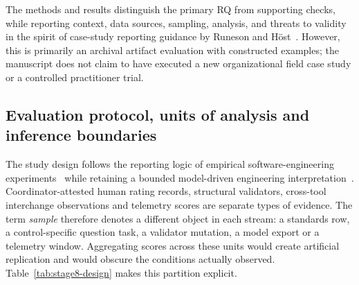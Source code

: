 \documentclass[12pt,a4paper]{article}
\begin{document}
The methods and results distinguish the primary RQ from supporting checks, while reporting context, data sources, sampling, analysis, and threats to validity in the spirit of case-study reporting guidance by Runeson and H{\"o}st~\cite{RunesonHost2009CaseStudy}. However, this is primarily an archival artifact evaluation with constructed examples; the manuscript does not claim to have executed a new organizational field case study or a controlled practitioner trial.\par


\subsection{Evaluation protocol, units of analysis and inference boundaries}
\label{sec:evaluation-matrix}
The study design follows the reporting logic of empirical software-engineering experiments~\cite{Wohlin2012Experimentation} while retaining a bounded model-driven engineering interpretation~\cite{Schmidt2006MDE}. Coordinator-attested human rating records, structural validators, cross-tool interchange observations and telemetry scores are separate types of evidence. The term \emph{sample} therefore denotes a different object in each stream: a standards row, a control-specific question task, a validator mutation, a model export or a telemetry window. Aggregating scores across these units would create artificial replication and would obscure the conditions actually observed. Table~\ref{tab:stage8-design} makes this partition explicit.
\end{document}
